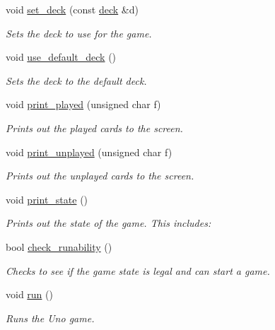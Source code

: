 \begin{DoxyCompactItemize}
void \hyperlink{class_uno___runner_a2ca7c819e3fc8774853cc5a49333eeb9}{set\-\_\-deck} (const \hyperlink{uno__deck_8h_ab634a15f4d19d3af113a71241b79c408}{deck} \&d)
\begin{DoxyCompactList}\small\item\em \-Sets the deck to use for the game. \end{DoxyCompactList}\item 
void \hyperlink{class_uno___runner_aecbd83efd47580d89f7ef9b030572c74}{use\-\_\-default\-\_\-deck} ()
\begin{DoxyCompactList}\small\item\em \-Sets the deck to the default deck. \end{DoxyCompactList}\item 
void \hyperlink{class_uno___runner_a885e7ac58c656e1cb0bc4e49cd494874}{print\-\_\-played} (unsigned char f)
\begin{DoxyCompactList}\small\item\em \-Prints out the played cards to the screen. \end{DoxyCompactList}\item 
void \hyperlink{class_uno___runner_a53b830015937722abd8ec515405534f9}{print\-\_\-unplayed} (unsigned char f)
\begin{DoxyCompactList}\small\item\em \-Prints out the unplayed cards to the screen. \end{DoxyCompactList}\item 
void \hyperlink{class_uno___runner_a2d16089c5bdf20c1120be067797a349a}{print\-\_\-state} ()
\begin{DoxyCompactList}\small\item\em \-Prints out the state of the game. \-This includes\-: \end{DoxyCompactList}\item 
bool \hyperlink{class_uno___runner_a876150bbc2a8aeadb3343681fb841c80}{check\-\_\-runability} ()
\begin{DoxyCompactList}\small\item\em \-Checks to see if the game state is legal and can start a game. \end{DoxyCompactList}\item 
void \hyperlink{class_uno___runner_a3f0847989a9868bcd023b41ee5f28d0a}{run} ()
\begin{DoxyCompactList}\small\item\em \-Runs the \-Uno game. \end{DoxyCompactList}\end{DoxyCompactItemize}


